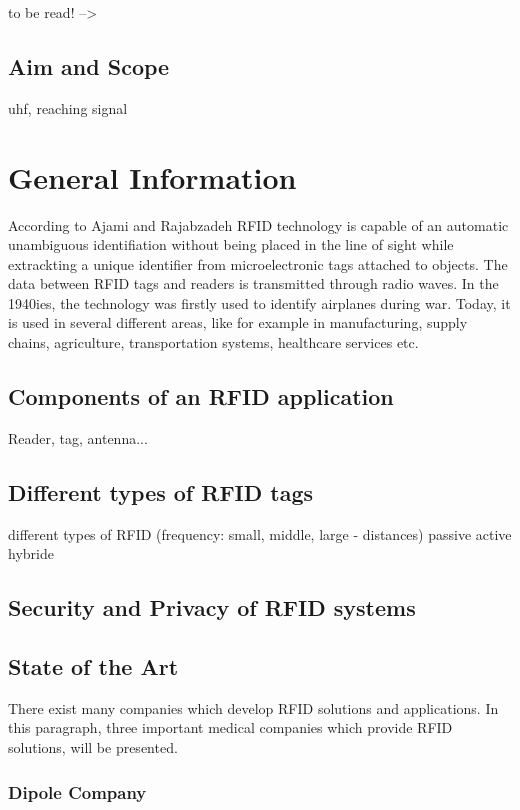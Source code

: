 to be read! --> \cite{considering_rfid}

\subsection{Aim and Scope}
uhf, reaching signal


\section{General Information}

According to Ajami and Rajabzadeh \cite{ncbi} RFID technology is capable of an automatic unambiguous identifiation without being placed in the line of sight while extrackting a unique identifier from microelectronic tags attached to objects. The data between RFID tags and readers is transmitted through radio waves. In the 1940ies, the technology was firstly used to identify airplanes during war. Today, it is used in several different areas, like for example in manufacturing, supply chains, agriculture, transportation systems, healthcare services etc. 

\subsection{Components of an RFID application}
Reader, tag, antenna...

\subsection{Different types of RFID tags}
different types of RFID (frequency: small, middle, large - distances)
passive active hybride 

\subsection{Security and Privacy of RFID systems}



\subsection{State of the Art}

There exist many companies which develop \ac{RFID} solutions and applications. In this paragraph, three important medical companies which provide RFID solutions, will be presented.

\subsubsection{Dipole Company}

